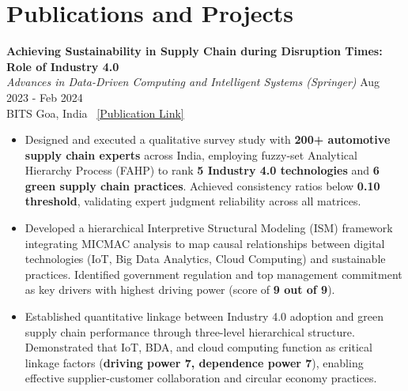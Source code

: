 \documentclass[11pt,letterpaper]{article}
\newcommand{\cvsection}[1]{\section*{#1}}
\begin{document}
\cvsection{Publications and Projects}

\textbf{Achieving Sustainability in Supply Chain during Disruption Times: Role of Industry 4.0}\\
\textit{Advances in Data-Driven Computing and Intelligent Systems (Springer)} \hfill Aug 2023 - Feb 2024\\
BITS Goa, India \textbar\ \href{https://www.springerprofessional.de/en/achieving-sustainability-in-supply-chain-during-disruption-times/26762004}{[Publication Link]}
\begin{itemize}[leftmargin=16pt, noitemsep, topsep=2pt]
    \item Designed and executed a qualitative survey study with \textbf{200+ automotive supply chain experts} across India, employing fuzzy-set Analytical Hierarchy Process (FAHP) to rank \textbf{5 Industry 4.0 technologies} and \textbf{6 green supply chain practices}. Achieved consistency ratios below \textbf{0.10 threshold}, validating expert judgment reliability across all matrices.
    
    \item Developed a hierarchical Interpretive Structural Modeling (ISM) framework integrating MICMAC analysis to map causal relationships between digital technologies (IoT, Big Data Analytics, Cloud Computing) and sustainable practices. Identified government regulation and top management commitment as key drivers with highest driving power (score of \textbf{9 out of 9}).
    
    \item Established quantitative linkage between Industry 4.0 adoption and green supply chain performance through three-level hierarchical structure. Demonstrated that IoT, BDA, and cloud computing function as critical linkage factors (\textbf{driving power 7, dependence power 7}), enabling effective supplier-customer collaboration and circular economy practices.
\end{itemize}

\vspace{6pt}
\end{document}
